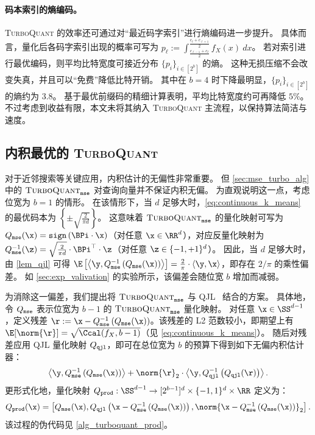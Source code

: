 \documentclass[11pt]{ctexart}
\newcommand{\TurboQuant}{\textsc{TurboQuant}\xspace}
\let\cref\ref
\begin{document}
\paragraph{码本索引的熵编码。}
\TurboQuant 的效率还可通过对“最近码字索引”进行熵编码进一步提升。 
具体而言，量化后各码字索引出现的概率可写为 $p_\ell := \int_{\frac{c_{\ell-1} + c_\ell}{2}}^{\frac{c_\ell + c_{\ell+1}}{2}} f_X(x)~dx$。
若对索引进行最优编码，则平均比特宽度可接近分布 $\{ p_i \}_{i \in [2^b]}$ 的熵。
这种无损压缩不会改变失真，并且可以“免费”降低比特开销。
其中在 $b=4$ 时下降最明显，$\{ p_i \}_{i \in [2^b]}$ 的熵约为 $3.8$。
基于最优前缀码的精细计算表明，平均比特宽度约可再降低 $5\%$。
不过考虑到收益有限，本文未将其纳入 \TurboQuant 主流程，以保持算法简洁与速度。




\subsection{内积最优的 \TurboQuant} \label{sec:prod_turbo_alg}
对于近邻搜索等关键应用，内积估计的无偏性非常重要。
但 \cref{sec:mse_turbo_alg} 中的 $\TurboQuant_{\tt mse}$ 对查询向量并不保证内积无偏。
为直观说明这一点，考虑位宽为 $b=1$ 的情形。
在该情形下，当 $d$ 足够大时，\cref{eq:continuous_k_means} 的最优码本为 $\left\{ \pm \sqrt{\frac{2}{\pi d}} \right\}$。
这意味着 $\TurboQuant_{\tt mse}$ 的量化映射可写为 $Q_{\tt mse}(\x) = {\tt sign} \left( \BPi \cdot \x \right)$（对任意 $\x \in \RR^d$），对应反量化映射为 $Q_{\tt mse}^{-1}(\z) = \sqrt{\frac{2}{\pi d}} \cdot \BPi^\top \cdot \z$（对任意 $\z \in \{ -1, +1\}^d$）。
因此，当 $d$ 足够大时，由 \cref{lem_qjl} 可得 $\E\left[ \left< \y, Q_{\tt mse}^{-1}\left( Q_{\tt mse}(\x) \right) \right> \right] = \frac{2}{\pi} \cdot \langle \y, \x \rangle$，即存在 $2/\pi$ 的乘性偏差。
如 \cref{sec:exp_valivation} 的实验所示，该偏差会随位宽 $b$ 增加而减弱。


为消除这一偏差，我们提出将 $\TurboQuant_{\tt mse}$ 与 QJL~\cite{qjl} 结合的方案。
具体地，令 $Q_{\tt mse}$ 表示位宽为 $b-1$ 的 $\TurboQuant_{\tt mse}$ 量化映射。
对任意 $\x \in \SS^{d-1}$，定义残差 $\r := \x - Q_{\tt mse}^{-1}\left( Q_{\tt mse}(\x) \right)$。该残差的 L2 范数较小，即期望上有 $\E[\norm{\r}] = \sqrt{\Ccal(f_X, b-1)}$（见 \cref{eq:continuous_k_means}）。
随后对残差应用 QJL 量化映射 $Q_{\tt qjl}$，即可在总位宽为 $b$ 的预算下得到如下无偏内积估计器：
\[
\left< \y, Q_{\tt mse}^{-1}\left( Q_{\tt mse}(\x) \right) \right> + \norm{\r}_2 \cdot \left< \y, Q_{\tt qjl}^{-1}\left( Q_{\tt qjl}(\r) \right) \right>.
\]
更形式化地，量化映射 $Q_{\tt prod}: \SS^{d-1} \to [2^{b-1}]^d \times \{ -1, 1 \}^d \times \RR$ 定义为：
\[
Q_{\tt prod}(\x) = \left[ Q_{\tt mse}(\x), Q_{\tt qjl}\left( \x - Q_{\tt mse}^{-1}\left( Q_{\tt mse}(\x) \right) \right), \norm{\x - Q_{\tt mse}^{-1}\left( Q_{\tt mse}(\x) \right)}_2 \right].
\]
该过程的伪代码见 \cref{alg_turboquant_prod}。
\end{document}

